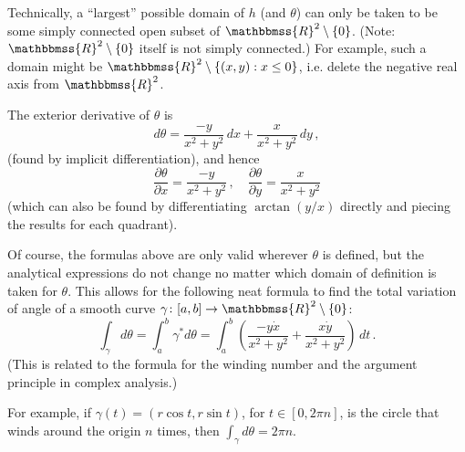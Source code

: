 \documentclass[12pt]{article}
\newcommand{\R}{\mathbbmss{R}}
\begin{document}
Technically, a ``largest'' possible domain of $h$ (and $\theta$) can only be taken to be some simply connected open subset of $\R^2 \setminus \{0\}$. (Note: $\R^2 \setminus \{0\}$ itself is not  simply connected.)
For example, such a domain might be $\R^2 \setminus \{ (x, y) : x \leq 0 \}$, i.e. delete the negative real axis from $\R^2$.

The exterior derivative of $\theta$
is
\[
d\theta = \frac{-y}{x^2 + y^2} \, dx + \frac{x}{x^2 + y^2} \, dy \,,
\]
(found by implicit differentiation),
and hence
\[
\frac{\partial \theta}{\partial x} = \frac{-y}{x^2 + y^2}\,, \quad
\frac{\partial \theta}{\partial y} = \frac{x}{x^2 + y^2}
\]
(which can also be found by differentiating $\arctan(y/x)$ directly
and piecing the results for each quadrant).

Of course, the formulas above are only valid wherever $\theta$ is defined,
but the analytical expressions do not change no matter which domain of definition is taken for $\theta$.
This allows for the following neat formula
to find the total variation of angle of a smooth curve $\gamma \colon [a, b] \to \R^2 \setminus \{0 \}$:
\[
\int_{\gamma} d\theta = \int_a^b \gamma^* d\theta
= \int_a^b \left( \frac{-y \dot{x} }{x^2 + y^2} + \frac{x \dot{y}}{x^2 + y^2} \right) \, dt\,.
\]
(This is related to the formula for the winding number
and the argument principle in complex analysis.)

For example, if $\gamma(t) = (r \cos t, r \sin t)$, for $t \in [0, 2\pi n]$,
is the circle that winds around the origin $n$ times, then $\int_{\gamma} d\theta = 2\pi n$.
\end{document}
